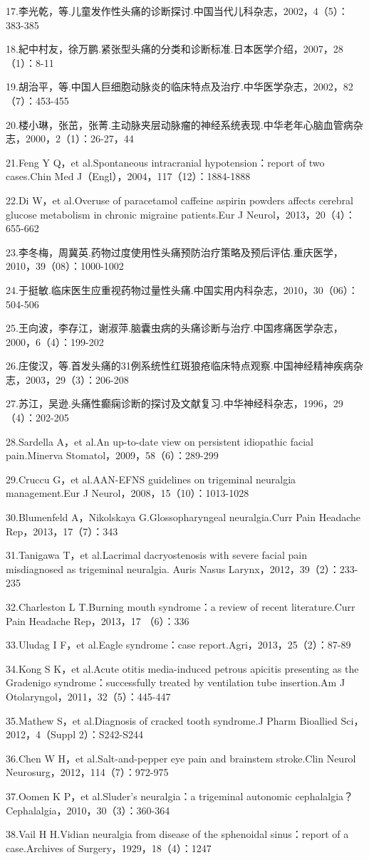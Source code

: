 17.李光乾，等.儿童发作性头痛的诊断探讨.中国当代儿科杂志，2002，4（5）：383-385

18.紀中村友，徐万鹏.紧张型头痛的分类和诊断标准.日本医学介绍，2007，28（1）：8-11

19.胡治平，等.中国人巨细胞动脉炎的临床特点及治疗.中华医学杂志，2002，82（7）：453-455

20.楼小琳，张茁，张菁.主动脉夹层动脉瘤的神经系统表现.中华老年心脑血管病杂志，2000，2（1）：26-27，44

21.Feng Y Q，et al.Spontaneous intracranial hypotension：report of two
cases.Chin Med J（Engl），2004，117（12）：1884-1888

22.Di W，et al.Overuse of paracetamol caffeine aspirin powders affects
cerebral glucose metabolism in chronic migraine patients.Eur J
Neurol，2013，20（4）：655-662

23.李冬梅，周冀英.药物过度使用性头痛预防治疗策略及预后评估.重庆医学，2010，39（08）：1000-1002

24.于挺敏.临床医生应重视药物过量性头痛.中国实用内科杂志，2010，30（06）：504-506

25.王向波，李存江，谢淑萍.脑囊虫病的头痛诊断与治疗.中国疼痛医学杂志，2000，6（4）：199-202

26.庄俊汉，等.首发头痛的31例系统性红斑狼疮临床特点观察.中国神经精神疾病杂志，2003，29（3）：206-208

27.苏江，吴逊.头痛性癫痫诊断的探讨及文献复习.中华神经科杂志，1996，29（4）：202-205

28.Sardella A，et al.An up-to-date view on persistent idiopathic facial
pain.Minerva Stomatol，2009，58（6）：289-299

29.Cruccu G，et al.AAN-EFNS guidelines on trigeminal neuralgia
management.Eur J Neurol，2008，15（10）：1013-1028

30.Blumenfeld A，Nikolskaya G.Glossopharyngeal neuralgia.Curr Pain
Headache Rep，2013，17（7）：343

31.Tanigawa T，et al.Lacrimal dacryostenosis with severe facial pain
misdiagnosed as trigeminal neuralgia. Auris Nasus
Larynx，2012，39（2）：233-235

32.Charleston L T.Burning mouth syndrome：a review of recent
literature.Curr Pain Headache Rep，2013，17 （6）：336

33.Uludag I F，et al.Eagle syndrome：case
report.Agri，2013，25（2）：87-89

34.Kong S K，et al.Acute otitis media-induced petrous apicitis
presenting as the Gradenigo syndrome：successfully treated by
ventilation tube insertion.Am J Otolaryngol，2011，32（5）：445-447

35.Mathew S，et al.Diagnosis of cracked tooth syndrome.J Pharm Bioallied
Sci，2012，4（Suppl 2）：S242-S244

36.Chen W H，et al.Salt-and-pepper eye pain and brainstem stroke.Clin
Neurol Neurosurg，2012，114（7）：972-975

37.Oomen K P，et al.Sluder's neuralgia：a trigeminal autonomic
cephalalgia？Cephalalgia，2010，30（3）：360-364

38.Vail H H.Vidian neuralgia from disease of the sphenoidal
sinus：report of a case.Archives of Surgery，1929，18（4）：1247

\protect\hypertarget{text00358.html}{}{}

